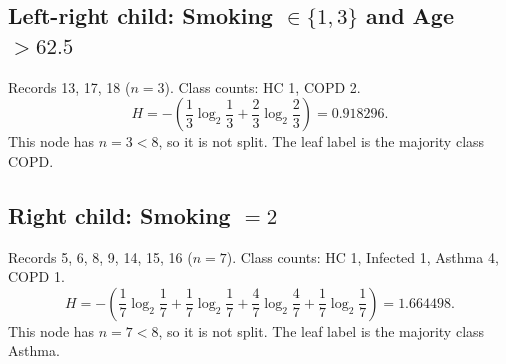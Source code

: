 \subsection*{Left-right child: Smoking $\in \{1,3\}$ and Age $> 62.5$}

Records 13, 17, 18 ($n=3$). Class counts: HC 1, COPD 2.
\[ H = -\left(\frac{1}{3}\log_2\frac{1}{3}+\frac{2}{3}\log_2\frac{2}{3}\right) = 0.918296. \]
This node has $n=3<8$, so it is not split. The leaf label is the majority class COPD.

\subsection*{Right child: Smoking $= 2$}

Records 5, 6, 8, 9, 14, 15, 16 ($n=7$). Class counts: HC 1, Infected 1, Asthma 4, COPD 1.
\[ H = -\left(\frac{1}{7}\log_2\frac{1}{7}+\frac{1}{7}\log_2\frac{1}{7}+\frac{4}{7}\log_2\frac{4}{7}+\frac{1}{7}\log_2\frac{1}{7}\right) = 1.664498. \]
This node has $n=7<8$, so it is not split. The leaf label is the majority class Asthma.
